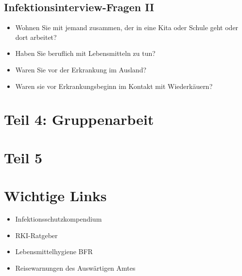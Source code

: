 \documentclass[
]{article}
\providecommand{\tightlist}{%
  \setlength{\itemsep}{0pt}\setlength{\parskip}{0pt}}
\begin{document}
\hypertarget{infektionsinterview-fragen-ii}{%
\subsection{Infektionsinterview-Fragen
II}\label{infektionsinterview-fragen-ii}}

\begin{itemize}
\tightlist
\item
  Wohnen Sie mit jemand zusammen, der in eine Kita oder Schule geht oder
  dort arbeitet?
\item
  Haben Sie beruflich mit Lebensmitteln zu tun?
\item
  Waren Sie vor der Erkrankung im Ausland?
\item
  Waren sie vor Erkrankungsbeginn im Kontakt mit Wiederkäuern?
\end{itemize}

\hypertarget{teil-4-gruppenarbeit}{%
\section{Teil 4: Gruppenarbeit}\label{teil-4-gruppenarbeit}}

\hypertarget{teil-5}{%
\section{Teil 5}\label{teil-5}}

\hypertarget{wichtige-links}{%
\section{Wichtige Links}\label{wichtige-links}}

\begin{itemize}
\tightlist
\item
  Infektionsschutzkompendium
\item
  RKI-Ratgeber
\item
  Lebensmittelhygiene BFR
\item
  Reisewarnungen des Auswärtigen Amtes
\end{itemize}
\end{document}
